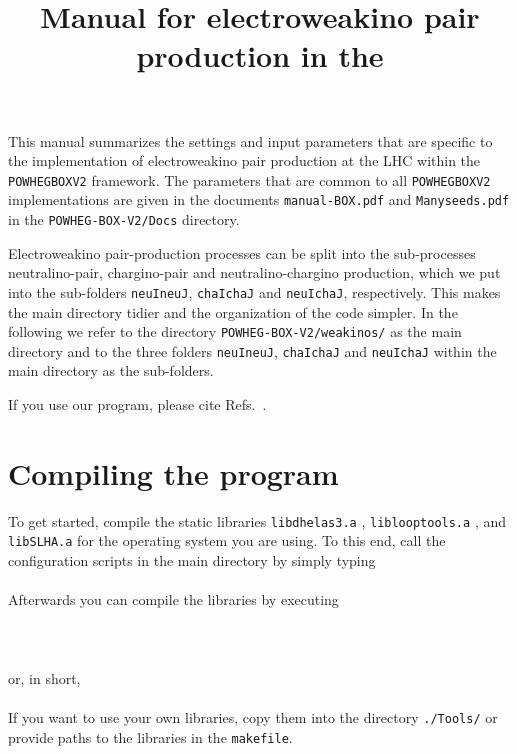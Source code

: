 \documentclass[a4paper,11pt]{article}
\title{Manual for electroweakino pair production in the \POWHEGBOXvTWO{}}
\date{}
\author{}
\newcommand\POWHEGBOXvTWO{{\tt POWHEG\;BOX\;V2}}
\begin{document}
\maketitle
%
\noindent
This manual summarizes the settings and input parameters that are specific to
the implementation of electroweakino pair production at the LHC within the
\POWHEGBOXvTWO{} framework. 
%
The parameters that are common to all \POWHEGBOXvTWO{} implementations are given in
the documents {\tt manual-BOX.pdf} and {\tt Manyseeds.pdf}
in the {\tt POWHEG-BOX-V2/Docs} directory.

Electroweakino pair-production processes can be split into the sub-processes neutralino-pair, chargino-pair and neutralino-chargino production, which we put into the sub-folders {\tt neuIneuJ}, {\tt chaIchaJ} and {\tt neuIchaJ}, respectively. This makes the main directory tidier and the organization of the code simpler. In the following we refer to the directory {\tt POWHEG-BOX-V2/weakinos/} as the main directory and to the three folders {\tt neuIneuJ}, {\tt chaIchaJ} and {\tt neuIchaJ} within the main directory as the sub-folders.

If you use our program, please cite Refs.~\cite{Baglio:2016,Nason:2004,Frixione:2007,Aliolo:2010}.

\section*{Compiling the program}
To get started, compile the static libraries {\tt libdhelas3.a} \cite{Murayama:1992gi}, {\tt liblooptools.a} \cite{Hahn:1998yk}, and {\tt libSLHA.a} \cite{Hahn:2006nq} for the operating system you are using. To this end, call the configuration scripts in the main directory by simply typing 
\\[2ex]
\hspace*{2cm}{\tt \$ ./configure.sh}
\\[2ex]
Afterwards you can compile the libraries by executing 
\\[2ex]
\hspace*{2cm}{\tt \$ make libdhelas3.a}
\\
\hspace*{2cm}{\tt \$ make liblooptools.a}
\\
\hspace*{2cm}{\tt \$ make libSLHA.a}
\\[2ex] 
or, in short, 
\\[2ex]
\hspace*{2cm}{\tt \$ make libs}
\\[2ex]
If you want to use your own libraries, copy them into the directory {\tt ./Tools/} or provide paths to the libraries in the {\tt makefile}.
\end{document}
